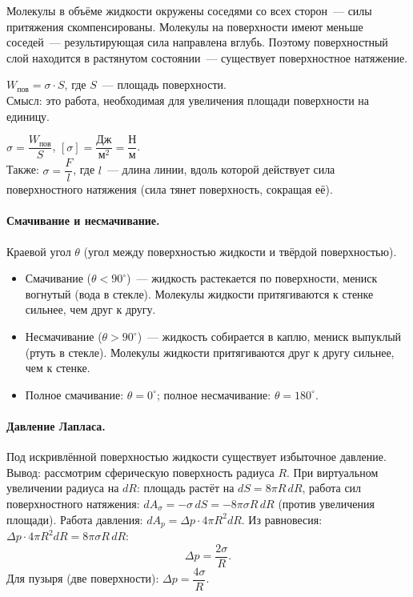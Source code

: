 \documentclass[12pt]{article}
\begin{document}
Молекулы в объёме жидкости окружены соседями со всех сторон~--- силы притяжения скомпенсированы. Молекулы на поверхности имеют меньше соседей~--- результирующая сила направлена вглубь. Поэтому поверхностный слой находится в растянутом состоянии~--- существует поверхностное натяжение.

\begin{definition}
	$W_{\text{пов}} = \sigma \cdot S$, где $S$~--- площадь поверхности.\\
	Смысл: это работа, необходимая для увеличения площади поверхности на единицу.
\end{definition}

\begin{definition}
	$\sigma = \dfrac{W_{\text{пов}}}{S}$, $[\sigma] = \dfrac{\text{Дж}}{\text{м}^2} = \dfrac{\text{Н}}{\text{м}}$.\\
	Также: $\sigma = \dfrac{F}{l}$, где $l$~--- длина линии, вдоль которой действует сила поверхностного натяжения (сила тянет поверхность, сокращая её).
\end{definition}

\paragraph{Смачивание и несмачивание.}
Краевой угол $\theta$ (угол между поверхностью жидкости и твёрдой поверхностью).
\begin{itemize}
	\item Смачивание ($\theta < 90^\circ$)~--- жидкость растекается по поверхности, мениск вогнутый (вода в стекле). Молекулы жидкости притягиваются к стенке сильнее, чем друг к другу.
	\item Несмачивание ($\theta > 90^\circ$)~--- жидкость собирается в каплю, мениск выпуклый (ртуть в стекле). Молекулы жидкости притягиваются друг к другу сильнее, чем к стенке.
	\item Полное смачивание: $\theta = 0^\circ$; полное несмачивание: $\theta = 180^\circ$.
\end{itemize}

\paragraph{Давление Лапласа.}
Под искривлённой поверхностью жидкости существует избыточное давление. Вывод: рассмотрим сферическую поверхность радиуса $R$. При виртуальном увеличении радиуса на $dR$: площадь растёт на $dS = 8\pi R\,dR$, работа сил поверхностного натяжения: $dA_\sigma = -\sigma\,dS = -8\pi\sigma R\,dR$ (против увеличения площади). Работа давления: $dA_p = \Delta p \cdot 4\pi R^2 dR$. Из равновесия: $\Delta p \cdot 4\pi R^2 dR = 8\pi\sigma R\,dR$:
\[
	\boxed{\Delta p = \frac{2\sigma}{R}}.
\]
Для пузыря (две поверхности): $\Delta p = \dfrac{4\sigma}{R}$.
\end{document}
